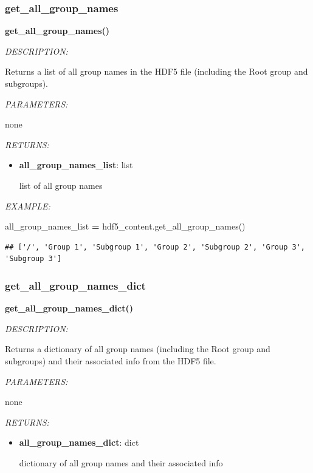 \documentclass[
]{article}
\newenvironment{Shaded}{\begin{snugshade}}{\end{snugshade}}
\newcommand{\NormalTok}[1]{#1}
\newcommand{\OperatorTok}[1]{\textcolor[rgb]{0.81,0.36,0.00}{\textbf{#1}}}
\begin{document}
\hypertarget{get_all_group_names}{%
\subsubsection{get\_all\_group\_names}\label{get_all_group_names}}

\textbf{get\_all\_group\_names()}

\emph{DESCRIPTION:}

Returns a list of all group names in the HDF5 file (including the Root group and subgroups).

\emph{PARAMETERS:}

none

\emph{RETURNS:}

\begin{itemize}
\item
  \textbf{all\_group\_names\_list}: list

  list of all group names
\end{itemize}

\emph{EXAMPLE:}

\begin{Shaded}
\begin{Highlighting}[]
\NormalTok{all_group_names_list }\OperatorTok{=}\NormalTok{ hdf5_content.get_all_group_names()}
\end{Highlighting}
\end{Shaded}

\begin{verbatim}
## ['/', 'Group 1', 'Subgroup 1', 'Group 2', 'Subgroup 2', 'Group 3', 'Subgroup 3']
\end{verbatim}

\hypertarget{get_all_group_names_dict}{%
\subsubsection{get\_all\_group\_names\_dict}\label{get_all_group_names_dict}}

\textbf{get\_all\_group\_names\_dict()}

\emph{DESCRIPTION:}

Returns a dictionary of all group names (including the Root group and subgroups) and their associated info from the HDF5 file.

\emph{PARAMETERS:}

none

\emph{RETURNS:}

\begin{itemize}
\item
  \textbf{all\_group\_names\_dict}: dict

  dictionary of all group names and their associated info
\end{itemize}
\end{document}
